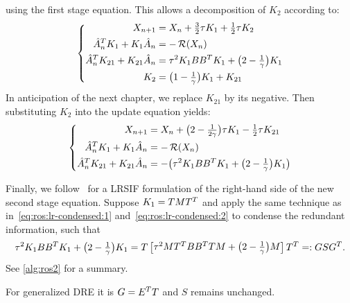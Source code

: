using the first stage equation.
This allows a decomposition of $K_2$ according to:
\begin{equation}
\left\{
\begin{aligned}
  X_{n+1} &= X_n + \tfrac{3}{2} \tau K_1 + \tfrac{1}{2} \tau K_2 \\
  \hat A_n^T K_1 + K_1 \hat A_n &= -\operatorname{\mathcal R}(X_n) \\
  \hat A_n^T K_{21} + K_{21} \hat A_n &= \tau^2 K_1 BB^T K_1 + \big( 2-\tfrac{1}{\gamma} \big) K_1 \\
  K_2 &= \big( 1-\tfrac{1}{\gamma} \big) K_1 + K_{21}
\end{aligned}
\right.
\end{equation}
In anticipation of the next chapter, we replace $K_{21}$ by its negative.
Then substituting $K_2$ into the update equation yields:
\begin{equation}
\left\{
\begin{aligned}
  X_{n+1} &= X_n + \big( 2 - \tfrac{1}{2\gamma} \big) \tau K_1 - \tfrac{1}{2} \tau K_{21} \\
  \hat A_n^T K_1 + K_1 \hat A_n &= -\operatorname{\mathcal R}(X_n) \\
  \hat A_n^T K_{21} + K_{21} \hat A_n &= -\big( \tau^2 K_1 BB^T K_1 + \big( 2-\tfrac{1}{\gamma} \big) K_1 \big)
\end{aligned}
\right.
\end{equation}

Finally, we follow~\cite{Lang2015} for a \ac{LRSIF} formulation of the right-hand side of the new second stage equation.
Suppose $K_1 = TMT^T$ and apply the same technique as
in~\eqref{eq:ros:lr-condensed:1}
and~\eqref{eq:ros:lr-condensed:2}
to condense the redundant information,
such that
\begin{equation}
  \tau^2 K_1 BB^T K_1 + \big( 2-\tfrac{1}{\gamma} \big) K_1
  = T \begin{bmatrix}
    \tau^2 MT^T BB^T TM + \big( 2-\tfrac{1}{\gamma} \big) M
  \end{bmatrix}
  T^T
  =: GSG^T
  .
\end{equation}
See \autoref{alg:ros2} for a summary.

\begin{remark}
  For generalized \ac{DRE} it is $G = E^T T$ and $S$ remains unchanged.
\end{remark}

